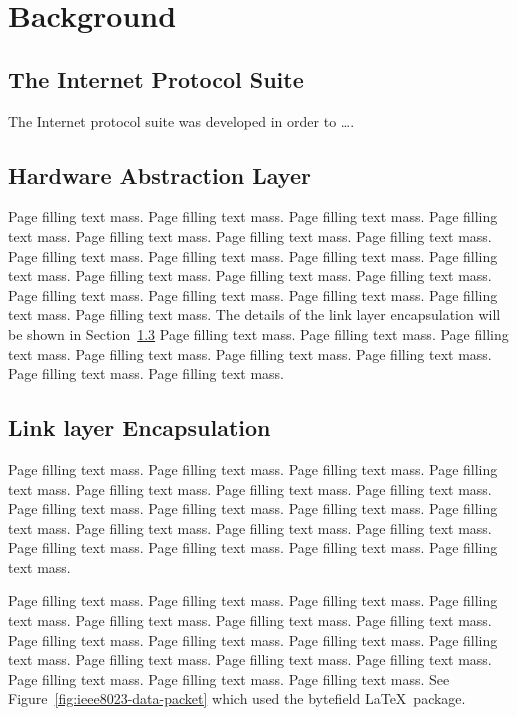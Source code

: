 \documentclass[12pt,a4paper,twoside,openright]{book}
\begin{document}
\chapter{Background}
\label{chap:background}


\section{The Internet Protocol Suite}
\label{sec:the-internet-protocol-suite}

The Internet protocol suite was developed in order to \ldots.

\section{Hardware Abstraction Layer}
\label{sec:hal}

Page filling text mass. Page filling text mass. Page filling text mass. Page
filling text mass. Page filling text mass. Page filling text mass. Page
filling text mass. Page filling text mass. Page filling text mass. Page
filling text mass. Page filling text mass. Page filling text mass. Page
filling text mass. Page filling text mass. Page filling text mass. Page
filling text mass. Page filling text mass. Page filling text mass. Page
filling text mass. The details of the link layer encapsulation will be shown
in Section~\ref{sec:llencap}
Page filling text mass. Page filling text mass. Page filling text mass. Page filling text mass. Page filling text mass. Page filling text mass. Page filling text mass. Page filling text mass. 

\section{Link layer Encapsulation}
\label{sec:llencap}


Page filling text mass. Page filling text mass. Page filling text mass. Page filling text mass. Page filling text mass. Page filling text mass. Page filling text mass. Page filling text mass. Page filling text mass. Page filling text mass. Page filling text mass. Page filling text mass. Page filling text mass. Page filling text mass. Page filling text mass. Page filling text mass. Page filling text mass. Page filling text mass. 

Page filling text mass. Page filling text mass. Page filling text mass. Page
filling text mass. Page filling text mass. Page filling text mass. Page
filling text mass. Page filling text mass. Page filling text mass. Page
filling text mass. Page filling text mass. Page filling text mass. Page
filling text mass. Page filling text mass. Page filling text mass. Page
filling text mass. Page filling text mass.
See Figure~\ref{fig:ieee8023-data-packet} which used the \textsf{bytefield}  \LaTeX\ package. 
\end{document}
